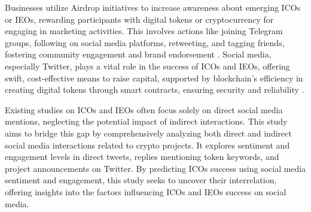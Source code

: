 \documentclass[runningheads]{llncs}
\begin{document}

Businesses utilize Airdrop initiatives to increase awareness about emerging ICOs or IEOs, rewarding participants with digital tokens or cryptocurrency for engaging in marketing activities. This involves actions like joining Telegram groups, following on social media platforms, retweeting, and tagging friends, fostering community engagement and brand endorsement \cite{howell2020initial}. Social media, especially Twitter, plays a vital role in the success of ICOs and IEOs, offering swift, cost-effective means to raise capital, supported by blockchain's efficiency in creating digital tokens through smart contracts, ensuring security and reliability \cite{morkunas2019blockchain}.

Existing studies on ICOs and IEOs often focus solely on direct social media mentions, neglecting the potential impact of indirect interactions. This study aims to bridge this gap by comprehensively analyzing both direct and indirect social media interactions related to crypto projects. It explores sentiment and engagement levels in direct tweets, replies mentioning token keywords, and project announcements on Twitter. By predicting ICOs success using social media sentiment and engagement, this study seeks to uncover their interrelation, offering insights into the factors influencing ICOs and IEOs success on social media.
\end{document}
